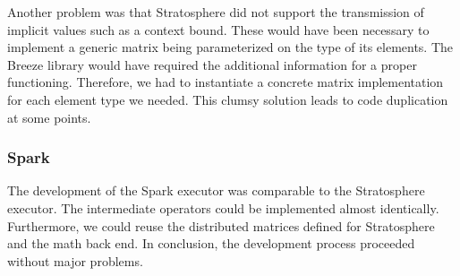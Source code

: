 Another problem was that Stratosphere did not support the transmission of implicit values such as a context bound.
These would have been necessary to implement a generic matrix being parameterized on the type of its elements.
The Breeze library would have required the additional information for a proper functioning.
Therefore, we had to instantiate a concrete matrix implementation for each element type we needed.
This clumsy solution leads to code duplication at some points.

\subsubsection{Spark}

The development of the Spark executor was comparable to the Stratosphere executor.
The intermediate operators could be implemented almost identically.
Furthermore, we could reuse the distributed matrices defined for Stratosphere and the math back end.
In conclusion, the development process proceeded without major problems. 
